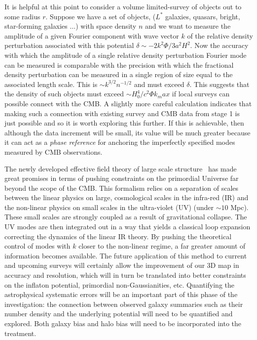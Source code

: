 \documentclass[psfig,11pt]{article}
\def\ni{\noindent}
\begin{document}
{It is helpful at this point to consider a volume limited-survey of objects out to some radius $r$. Suppose we have a set of objects, ($L^\ast$ galaxies, quasars, bright, star-forming galaxies $\dots$) with space density $n$ and we want to measure the amplitude of a given Fourier component with wave vector $k$ of the relative density perturbation associated with this potential $\delta\sim-2k^2\Phi/3a^2H^2$. Now the accuracy with which the amplitude of a single relative density perturbation Fourier mode can be measured is comparable with the precision with which the fractional density perturbation can be measured in a single region of size equal to the associated length scale. This is $\sim k^{3/2}n^{-1/2}$ and must exceed $\delta$. This suggests that the density of such objects must exceed $\sim H_0^4/c^2\Phi k_max$ if local surveys can possible connect with the CMB. A slightly more careful calculation indicates that making such a connection with existing survey and CMB data from stage 1 is just possible and so it is worth exploring this further. If this is achievable, then although the data increment will be small, its value will be much greater because it can act as a {\it phase reference} for anchoring the imperfectly specified modes measured by CMB observations.

\ni{\bf Constraints on Inflation:}
The newly developed effective field theory of large scale structure~\cite{Carrasco2012} has made great promises in terms of pushing constraints on the primordial Universe far beyond the scope of the CMB. This formalism relies on a separation of scales between the linear physics on large, cosmological scales in the infra-red (IR) and the non-linear physics on small scales in the ultra-violet (UV) (under $\sim10$ Mpc). These small scales are strongly coupled as a result of gravitational collapse. The UV modes are then integrated out in a way that yields a classical loop expansion correcting the dynamics of the linear IR theory. By pushing the theoretical control of modes with $k$ closer to the non-linear regime, a far greater amount of information becomes available. The future application of this method to current and upcoming surveys will certainly allow the improvement of our 3D map in accuracy and resolution, which will in turn be translated into better constraints on the inflaton potential, primordial non-Gaussianities, etc. Quantifying the astrophysical systematic errors will be an important part of this phase of the investigation: the connection between observed galaxy summaries such as their number density and the underlying potential will need to be quantified and explored. Both galaxy bias and halo bias will need to be incorporated into the treatment.

}
\end{document}
